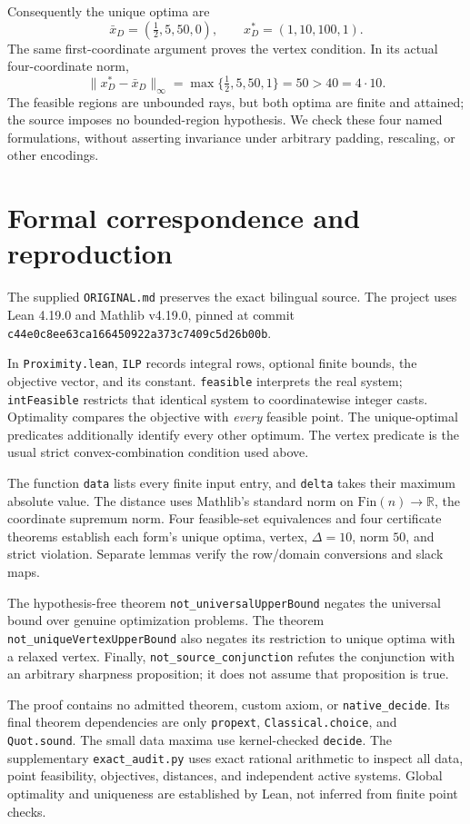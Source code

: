 \documentclass[10pt]{article}
\begin{document}
Consequently the unique optima are
\[
 \bar x_D=(\tfrac12,5,50,0),\qquad x_D^*=(1,10,100,1).
\]
The same first-coordinate argument proves the vertex condition. In its actual four-coordinate norm,
\[
 \boxed{\|x_D^*-\bar x_D\|_\infty
 =\max\{\tfrac12,5,50,1\}=50>40=4\cdot10.}
\]
The feasible regions are unbounded rays, but both optima are finite and attained; the source imposes no bounded-region hypothesis. We check these four named formulations, without asserting invariance under arbitrary padding, rescaling, or other encodings.

\section{Formal correspondence and reproduction}
The supplied \texttt{ORIGINAL.md} preserves the exact bilingual source. The project uses Lean 4.19.0 and Mathlib v4.19.0, pinned at commit
\texttt{c44e0c8ee63ca166450922a373c7409c5d26b00b}.

In \texttt{Proximity.lean}, \texttt{ILP} records integral rows, optional finite bounds, the objective vector, and its constant. \texttt{feasible} interprets the real system; \texttt{intFeasible} restricts that identical system to coordinatewise integer casts. Optimality compares the objective with \emph{every} feasible point. The unique-optimal predicates additionally identify every other optimum. The vertex predicate is the usual strict convex-combination condition used above.

The function \texttt{data} lists every finite input entry, and \texttt{delta} takes their maximum absolute value. The distance uses Mathlib's standard norm on $\mathrm{Fin}(n)\to\mathbb R$, the coordinate supremum norm. Four feasible-set equivalences and four certificate theorems establish each form's unique optima, vertex, $\Delta=10$, norm $50$, and strict violation. Separate lemmas verify the row/domain conversions and slack maps.

The hypothesis-free theorem \texttt{not\_universalUpperBound} negates the universal bound over genuine optimization problems. The theorem \texttt{not\_uniqueVertexUpperBound} also negates its restriction to unique optima with a relaxed vertex. Finally, \texttt{not\_source\_conjunction} refutes the conjunction with an arbitrary sharpness proposition; it does not assume that proposition is true.

The proof contains no admitted theorem, custom axiom, or \texttt{native\_decide}. Its final theorem dependencies are only \texttt{propext}, \texttt{Classical.choice}, and \texttt{Quot.sound}. The small data maxima use kernel-checked \texttt{decide}. The supplementary \texttt{exact\_audit.py} uses exact rational arithmetic to inspect all data, point feasibility, objectives, distances, and independent active systems. Global optimality and uniqueness are established by Lean, not inferred from finite point checks.
\end{document}
